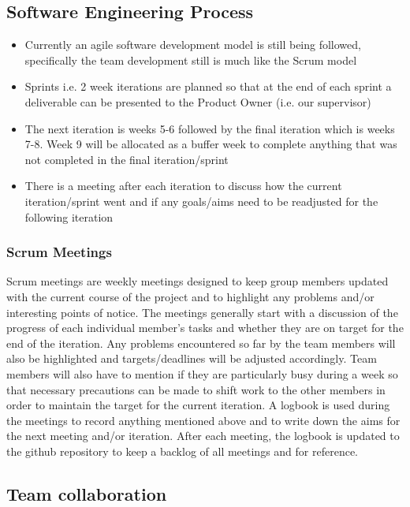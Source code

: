 \documentclass[12pt]{article}
\begin{document}
\subsection{Software Engineering Process}
\begin{itemize}
\item Currently an agile software development model is still being followed,
specifically the team development still is much like the Scrum model
\item Sprints i.e. 2 week iterations are planned so that at the end of each
sprint a deliverable can be presented to the Product Owner (i.e. our
supervisor)
\item The next iteration is weeks 5-6 followed by the final iteration which
is weeks 7-8. Week 9 will be allocated as a buffer week to complete
anything that was not completed in the final iteration/sprint
\item There is a meeting after each iteration to discuss how the current
iteration/sprint went and if any goals/aims need to be readjusted
for the following iteration
\end{itemize}
\subsubsection{Scrum Meetings}
Scrum meetings are weekly meetings designed to keep group members updated with 
the current course of the project and to highlight any problems and/or 
interesting points of notice. The meetings generally start with a discussion of 
the progress of each individual member's tasks and whether they are on target for 
the end of the iteration. Any problems encountered so far by the team members 
will also be highlighted and targets/deadlines will be adjusted accordingly. 
Team members will also have to mention if they are particularly busy during a 
week so that necessary precautions can be made to shift work to the other 
members in order to maintain the target for the current iteration. 
A logbook is used during the meetings to record anything mentioned 
above and to write down the aims for the next meeting and/or iteration. 
After each meeting, the logbook is updated to the github repository to keep a 
backlog of all meetings and for reference.

\subsection{Team collaboration}
\end{document}
